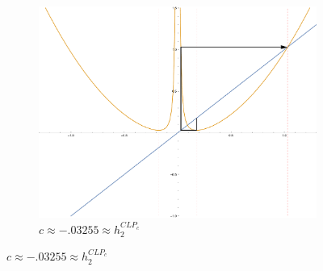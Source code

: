 \begin{figure}[ht]
\begin{subfigure}[b]{0.3\textwidth}
				\includegraphics[width=\textwidth]{./img/plot-003255}
				\caption{$c \approx -.03255 \approx h_2^{CLP_c}$}
		\end{subfigure}


\end{figure}
